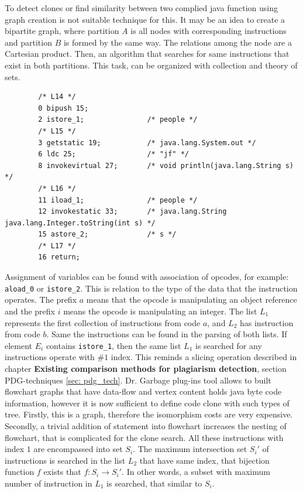 \documentclass{report}
\begin{document}
To detect clones or find similarity between two complied java function using graph creation is not suitable technique for this. It may be an idea to create a bipartite graph, where partition $A$ is all nodes with corresponding instructions and partition $B$ is formed by the same way. The relations among the node are a Cartesian product. Then, an algorithm that searches for same instructions that exist in both partitions. This task, can be organized with collection and theory of sets.
\begin{lstlisting}
        /* L14 */
        0 bipush 15;
        2 istore_1;               /* people */
        /* L15 */
        3 getstatic 19;           /* java.lang.System.out */
        6 ldc 25;                 /* "jf" */
        8 invokevirtual 27;       /* void println(java.lang.String s) */
        /* L16 */
        11 iload_1;               /* people */
        12 invokestatic 33;       /* java.lang.String java.lang.Integer.toString(int s) */
        15 astore_2;              /* s */
        /* L17 */
        16 return;
\end{lstlisting}

Assignment of variables can be found with association of opcodes, for example: \texttt{aload\_0} or \texttt{istore\_2}. 
This is relation to the type of the data that the instruction operates. The prefix $a$ means that the opcode is manipulating an object reference and the prefix $i$ means the opcode is manipulating an integer. 
The list $ L_{1}$ represents the first collection of instructions from code $a$, and $L_{2}$ has instruction from code $b$. 
Same the instructions can be found in the parsing of both lists.
If element $E_{i}$ contains \texttt{istore\_1}, then the same list $L_{1}$ is searched for any instructions operate with $\#1$ index. This reminds a slicing operation described in chapter \textbf{Existing comparison methods for plagiarism detection}, section PDG-techniques \ref{sec: pdg_tech}. Dr. Garbage plug-ins tool allows to built flowchart graphs that have data-flow and vertex content holds java byte code information, however it is now sufficient to define code clone with such types of tree. Firstly, this is a graph, therefore the isomorphism costs are very expensive. Secondly, a trivial addition of statement into flowchart increases the nesting of flowchart, that is complicated for the clone search.
All these instructions with index $1$ are encompassed into set $S_{i}$. The maximum intersection set $S_{i}'$ of instructions is searched in the list $L_{2}$ that have same index, that bijection function $f$ exists that $f: S_{i} \rightarrow S_{i}'$. In other words, a subset with maximum number of instruction in $L_{1}$ is searched, that similar to $S_{i}$.
\end{document}
